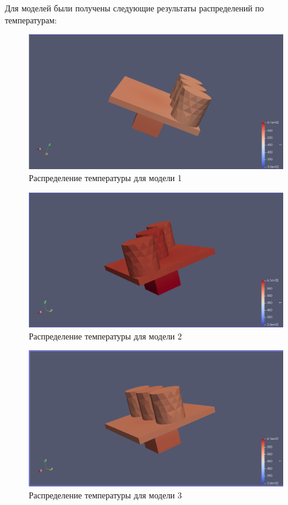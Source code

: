 \documentclass[a4paper,12pt]{article}
\theoremstyle{plain} %
\theoremstyle{definition} %
\theoremstyle{remark} %
\begin{document}
Для моделей были получены следующие результаты распределений по температурам:

\begin{figure}[h]
	\begin{center}
		\includegraphics[width=0.4\linewidth]{5.1.png}
		\caption{Распределение температуры для модели 1} %
	\end{center}
\end{figure}

\begin{figure}[h]
	\begin{center}
		\includegraphics[width=0.4\linewidth]{5.2.png}
		\caption{Распределение температуры для модели 2} %
	\end{center}
\end{figure}

\begin{figure}[h]
	\begin{center}
		\includegraphics[width=0.4\linewidth]{5.3.png}
		\caption{Распределение температуры для модели 3} %
	\end{center}
\end{figure}
\end{document}

